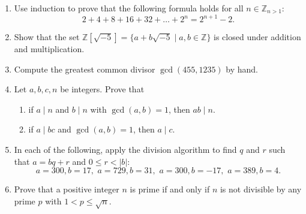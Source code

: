 \documentclass{article}
\begin{document}
\begin{enumerate}
\item Use induction to prove that the following formula holds for all $n \in \mathbb Z_{n>1}$:
	\[
		2 + 4 + 8 + 16 + 32 + \ldots + 2^n = 2^{n+1} - 2.
	\]

\item Show that the set $\mathbb Z [\sqrt{-5}] = \{ a + b \sqrt{-5}\; |\; a,b \in \mathbb Z \}$ is closed under addition and multiplication.

\item Compute the greatest common divisor $\gcd(455,1235)$ by hand.

\item Let $a,b,c,n$ be integers.  Prove that
\begin{enumerate}
\item if $a \mid n$ and $b\mid n$ with $\gcd(a,b)=1$, then $ab\mid n$.
\item if $a\mid bc$ and $\gcd(a,b)=1$, then $a\mid c$.
\end{enumerate}

\item
In each of the following, apply the division algorithm
to find $q$ and $r$ such that
$a = bq + r$ and $0\leq r < |b|$:
$$
 a=300, b=17,\,\,
a=729,b=31,\,\,
a=300,b=-17,\,\,
a=389,b=4.
$$

\item Prove that a positive integer $n$ is prime if
and only if $n$ is not divisible by any prime $p$
with $1 < p \leq \sqrt{n}$.



\end{enumerate}
\end{document}
